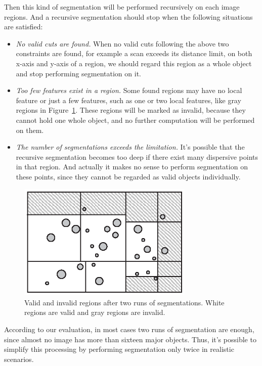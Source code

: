 Then this kind of segmentation will be performed recursively on each image regions. And a recursive segmentation should stop when the following situations are satisfied:

\begin{itemize}
\item \textit{No valid cuts are found.} When no valid cuts following the above two constraints are found, for example a scan exceeds its distance limit, on both x-axis and y-axis of a region, we should regard this region as a whole object and stop performing segmentation on it.

\item \textit{Too few features exist in a region.} Some found regions may have no local feature or just a few features, such as one or two local features, like gray regions in Figure~\ref{fig:segmentation-2}. These regions will be marked as invalid, because they cannot hold one whole object, and no further computation will be performed on them.

\item \textit{The number of segmentations exceeds the limitation.} It's possible that the recursive segmentation becomes too deep if there exist many dispersive points in that region. And actually it makes no sense to perform segmentation on these points, since they cannot be regarded as valid objects individually.

\end{itemize}

\begin{figure}[!ht]
\centering
\includegraphics[width=3.3in]{images/fig-segmentation-2.eps}
\caption{Valid and invalid regions after two runs of segmentations. White regions are valid and gray regions are invalid.}
\label{fig:segmentation-2}
\end{figure}


According to our evaluation, in most cases two runs of segmentation are enough, since almost no image has more than sixteen major objects. Thus, it's possible to simplify this processing by performing segmentation only twice in realistic scenarios.

